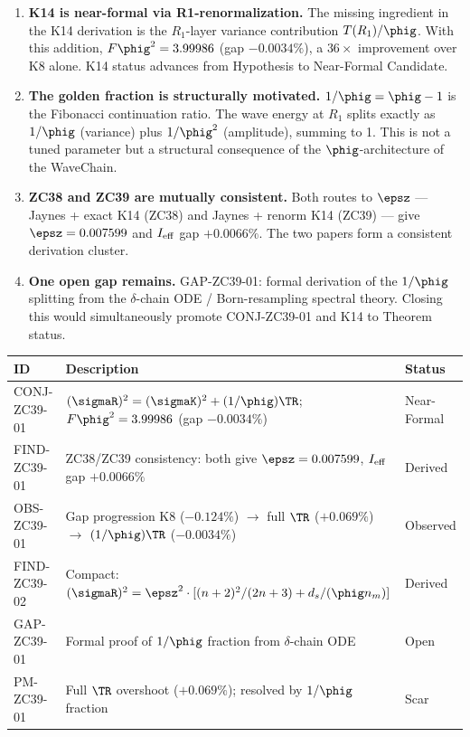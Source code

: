 \documentclass[12pt, a4paper]{article}
\begin{document}
\begin{enumerate}[leftmargin=*]

\item \textbf{K14 is near-formal via R1-renormalization.}
The missing ingredient in the K14 derivation is the $R_1$-layer
variance contribution $T(R_1)/\phig$.
With this addition, $F\phig^2 = 3.99986$ (gap $-0.0034\%$),
a $36\times$ improvement over K8 alone.
K14 status advances from Hypothesis to Near-Formal Candidate.

\item \textbf{The golden fraction is structurally motivated.}
$1/\phig = \phig - 1$ is the Fibonacci continuation ratio.
The wave energy at $R_1$ splits exactly as $1/\phig$ (variance)
plus $1/\phig^2$ (amplitude), summing to 1.
This is not a tuned parameter but a structural consequence of
the $\phig$-architecture of the WaveChain.

\item \textbf{ZC38 and ZC39 are mutually consistent.}
Both routes to $\epsz$ --- Jaynes + exact K14 (ZC38)
and Jaynes + renorm K14 (ZC39) --- give $\epsz = 0.007599$
and $I_{\rm eff}$ gap $+0.0066\%$.
The two papers form a consistent derivation cluster.

\item \textbf{One open gap remains.}
GAP-ZC39-01: formal derivation of the $1/\phig$ splitting from
the $\delta$-chain ODE / Born-resampling spectral theory.
Closing this would simultaneously promote CONJ-ZC39-01 and K14
to Theorem status.

\end{enumerate}

\bigskip
\begin{formalbox}[title={Atomic Registry --- ZC39}]
\begin{center}
\renewcommand{\arraystretch}{1.3}
\small
\begin{tabular}{lp{7.5cm}l}
\toprule
ID & Description & Status \\
\midrule
CONJ-ZC39-01 & $(\sigmaR)^2 = (\sigmaK)^2 + (1/\phig)\TR$;
               $F\phig^2 = 3.99986$ (gap $-0.0034\%$)
             & Near-Formal \\
FIND-ZC39-01 & ZC38/ZC39 consistency: both give $\epsz=0.007599$,
               $I_{\rm eff}$ gap $+0.0066\%$
             & Derived \\
OBS-ZC39-01  & Gap progression K8 ($-0.124\%$) $\to$ full $\TR$ ($+0.069\%$)
               $\to$ $(1/\phig)\TR$ ($-0.0034\%$)
             & Observed \\
FIND-ZC39-02 & Compact: $(\sigmaR)^2 = \epsz^2\cdot[(n+2)^2/(2n+3) + d_s/(\phig n_m)]$
             & Derived \\
GAP-ZC39-01  & Formal proof of $1/\phig$ fraction from $\delta$-chain ODE
             & Open \\
PM-ZC39-01   & Full $\TR$ overshoot ($+0.069\%$); resolved by $1/\phig$ fraction
             & Scar \\
\bottomrule
\end{tabular}
\end{center}
\end{formalbox}
\end{document}
